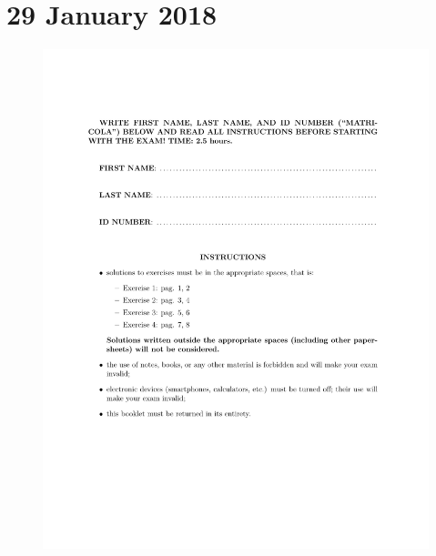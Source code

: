 \documentclass[a4paper,11pt,oneside]{book}
\begin{document}

\chapter{29 January 2018}

\begin{figure}[H]
    \centering
    \begin{minipage}{0.45\textwidth}
        \includegraphics[width=\textwidth,page=3]{images/29_Jan_2018.pdf}
    \end{minipage}
    \hfill
    \begin{minipage}{0.45\textwidth}

\end{minipage}
\end{figure}
\end{document}
